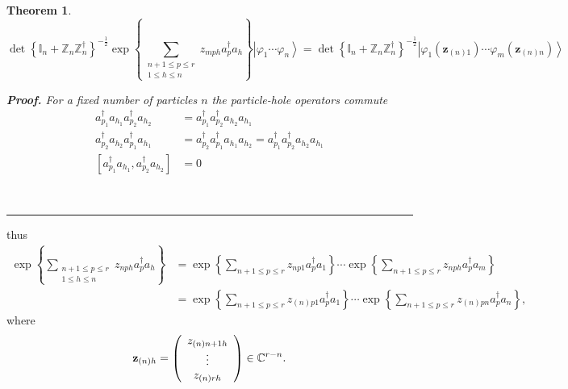\documentclass[aps,preprint]{revtex4}%
\newtheorem{theorem}{Theorem}
\newenvironment{proof}[1][Proof]{\noindent\textbf{#1.} }{\ \rule{0.5em}{0.5em}}
\begin{document}
\begin{theorem}%
\begin{equation}
\det\left\{  \mathbb{I}_{n}+\mathbb{Z}_{n}\mathbb{Z}_{n}^{\dagger}\right\}
^{-\frac{1}{2}}\exp\left\{  \sum_{\substack{n+1\leq p\leq r\\1\leq h\leq
n}}z_{mph}a_{p}^{\dagger}a_{h}\right\}  \left\vert \varphi_{1}\cdots
\varphi_{n}\right\rangle =\det\left\{  \mathbb{I}_{n}+\mathbb{Z}_{n}%
\mathbb{Z}_{n}^{\dagger}\right\}  ^{-\frac{1}{2}}\left\vert \varphi_{1}\left(
\mathbf{z}_{\left(  n\right)  1}\right)  \cdots\varphi_{m}\left(
\mathbf{z}_{\left(  n\right)  n}\right)  \right\rangle
\end{equation}


\begin{proof}
For a fixed number of particles $n$ the particle-hole operators commute
\begin{align}
a_{p_{1}}^{\dagger}a_{h_{1}}a_{p_{2}}^{\dagger}a_{h_{2}}  &  =a_{p_{1}%
}^{\dagger}a_{p_{2}}^{\dagger}a_{h_{2}}a_{h_{1}}\\
a_{p_{2}}^{\dagger}a_{h_{2}}a_{p_{1}}^{\dagger}a_{h_{1}}  &  =a_{p_{2}%
}^{\dagger}a_{p_{1}}^{\dagger}a_{h_{1}}a_{h_{2}}=a_{p_{1}}^{\dagger}a_{p_{2}%
}^{\dagger}a_{h_{2}}a_{h_{1}}\\
\left[  a_{p_{1}}^{\dagger}a_{h_{1}},a_{p_{2}}^{\dagger}a_{h_{2}}\right]   &
=0
\end{align}

\end{proof}
\end{theorem}

thus%
\begin{align}
\exp\left\{  \sum_{\substack{n+1\leq p\leq r\\1\leq h\leq n}}z_{nph}%
a_{p}^{\dagger}a_{h}\right\}   &  =\exp\left\{  \sum_{n+1\leq p\leq r}%
z_{np1}a_{p}^{\dagger}a_{1}\right\}  \cdots\exp\left\{  \sum_{n+1\leq p\leq
r}z_{nph}a_{p}^{\dagger}a_{m}\right\} \\
&  =\exp\left\{  \sum_{n+1\leq p\leq r}z_{\left(  n\right)  p1}a_{p}^{\dagger
}a_{1}\right\}  \cdots\exp\left\{  \sum_{n+1\leq p\leq r}z_{\left(  n\right)
pn}a_{p}^{\dagger}a_{n}\right\}  ,
\end{align}
where
\begin{equation}
\mathbf{z}_{\left(  n\right)  h}=\left(
\begin{array}
[c]{c}%
z_{\left(  n\right)  n+1h}\\
\vdots\\
z_{\left(  n\right)  rh}%
\end{array}
\right)  \in\mathbb{C}^{r-n}.
\end{equation}
\end{document}
